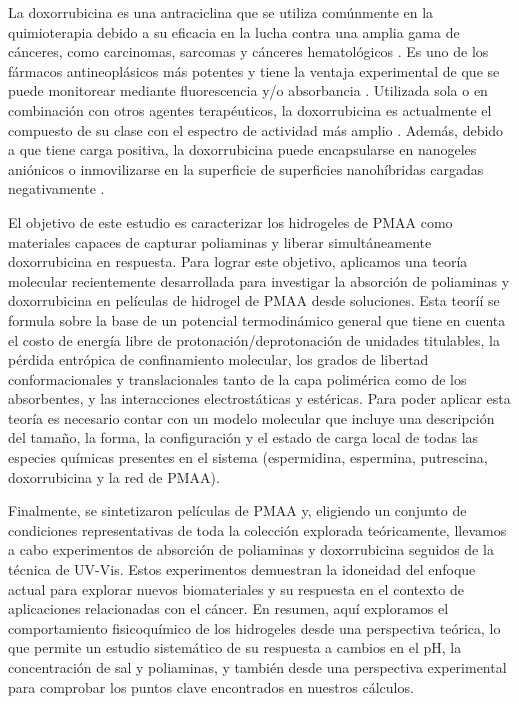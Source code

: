 La doxorrubicina es una antraciclina que se utiliza com\'unmente en la quimioterapia debido a su eficacia en la lucha contra una amplia gama de c\'anceres, como carcinomas, sarcomas y c\'anceres hematol\'ogicos \addcite[Panis2012].
Es uno de los f\'armacos antineopl\'asicos más potentes y tiene la ventaja experimental de que se puede monitorear mediante fluorescencia y/o absorbancia .
Utilizada sola o en combinaci\'on con otros agentes terap\'euticos, la doxorrubicina es actualmente el compuesto de su clase con el espectro de actividad m\'as amplio \addcite[Carvalho2009].
Adem\'as, debido a que tiene carga positiva, la doxorrubicina puede encapsularse en nanogeles ani\'onicos \addcite[Li2019] o inmovilizarse en la superficie de superficies nanoh\'ibridas cargadas negativamente \addcite[Kazempour2019].

El objetivo de este estudio es caracterizar los hidrogeles de PMAA como materiales capaces de capturar poliaminas y liberar simult\'aneamente doxorrubicina en respuesta.
Para lograr este objetivo, aplicamos una teor\'ia molecular recientemente desarrollada para investigar la absorci\'on de poliaminas y doxorrubicina en pel\'iculas de hidrogel de PMAA desde soluciones.
Esta teorí\'i se formula sobre la base de un potencial termodin\'amico general que tiene en cuenta el costo de energ\'ia libre de protonaci\'on/deprotonaci\'on de unidades titulables, la p\'erdida entr\'opica de confinamiento molecular, los grados de libertad conformacionales y translacionales tanto de la capa polim\'erica como de los absorbentes, y las interacciones electrost\'aticas y est\'ericas.
Para poder aplicar esta teor\'ia es necesario contar con un modelo molecular que incluye una descripci\'on del tama\~no, la forma, la configuraci\'on y el estado de carga local de todas las especies qu\'imicas presentes en el sistema (espermidina, espermina, putrescina, doxorrubicina y la red de PMAA).

Finalmente, se sintetizaron pel\'iculas de PMAA y, eligiendo un conjunto de condiciones representativas de toda la colecci\'on explorada te\'oricamente, llevamos a cabo experimentos de absorci\'on de poliaminas y doxorrubicina seguidos de la t\'ecnica de UV-Vis.
Estos experimentos demuestran la idoneidad del enfoque actual para explorar nuevos biomateriales y su respuesta en el contexto de aplicaciones relacionadas con el c\'ancer.
En resumen, aqu\'i exploramos el comportamiento fisicoqu\'imico de los hidrogeles desde una perspectiva te\'orica, lo que permite un estudio sistem\'atico de su respuesta a cambios en el pH, la concentraci\'on de sal y poliaminas, y tambi\'en desde una perspectiva experimental para comprobar los puntos clave encontrados en nuestros c\'alculos.


